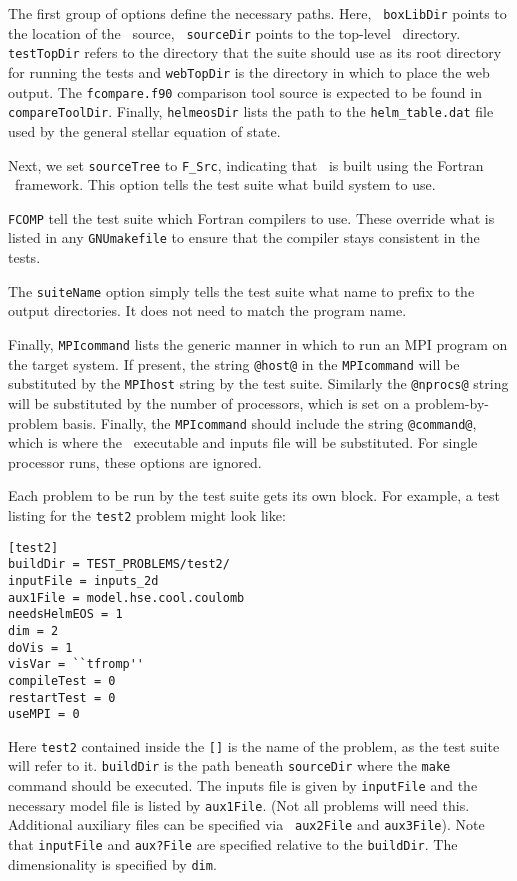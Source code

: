 The first group of options define the necessary paths.  Here, {\tt
  boxLibDir} points to the location of the \boxlib\ source, {\tt
  sourceDir} points to the top-level \maestro\ directory.  {\tt
  testTopDir} refers to the directory that the suite should use as its
root directory for running the tests and {\tt webTopDir} is the
directory in which to place the web output.  The {\tt fcompare.f90}
comparison tool source is expected to be found in {\tt
  compareToolDir}.  Finally, {\tt helmeosDir} lists the path to the
{\tt helm\_table.dat} file used by the general stellar equation of
state.

Next, we set {\tt sourceTree} to {\tt F\_Src}, indicating that
\maestro\ is built using the Fortran \boxlib\ framework.  This option
tells the test suite what build system to use.

{\tt FCOMP} tell the test suite which Fortran compilers to use.  These
override what is listed in any {\tt GNUmakefile} to ensure that the
compiler stays consistent in the tests.

The {\tt suiteName} option simply tells the test suite what name to
prefix to the output directories.  It does not need to match the
program name.  

Finally, {\tt MPIcommand} lists the generic manner in which to run an
MPI program on the target system.  If present, the string {\tt @host@}
in the {\tt MPIcommand} will be substituted by the {\tt MPIhost}
string by the test suite.  Similarly the {\tt @nprocs@} string will be
substituted by the number of processors, which is set on a
problem-by-problem basis.  Finally, the {\tt MPIcommand} should
include the string {\tt @command@}, which is where the
\maestro\ executable and inputs file will be substituted.  For single
processor runs, these options are ignored.

Each problem to be run by the test suite gets its own block.  For
example, a test listing for the {\tt test2} problem might look like:

\begin{lstlisting}
[test2]
buildDir = TEST_PROBLEMS/test2/
inputFile = inputs_2d
aux1File = model.hse.cool.coulomb
needsHelmEOS = 1
dim = 2
doVis = 1
visVar = ``tfromp''
compileTest = 0 
restartTest = 0
useMPI = 0
\end{lstlisting}

Here {\tt test2} contained inside the {\tt []} is the name of the
problem, as the test suite will refer to it.  {\tt buildDir} is the
path beneath {\tt sourceDir} where the {\tt make} command should be
executed.  The inputs file is given by {\tt inputFile} and the
necessary model file is listed by {\tt aux1File}. (Not all problems
will need this.  Additional auxiliary files can be specified via {\tt
  aux2File} and {\tt aux3File}).  Note that {\tt inputFile} and {\tt aux?File} are
specified relative to the {\tt buildDir}. The dimensionality is specified by {\tt dim}.


